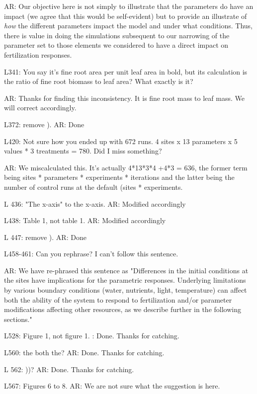 \documentclass{article}
\begin{document}
{\textsf{AR: Our objective here is not simply to illustrate that the parameters do have an impact (we agree that this would be self-evident) but to provide an illustrate of \emph{how} the different parameters impact the model and under what conditions.  Thus, there is value in doing the simulations subsequent to our narrowing of the parameter set to those elements we considered to have a direct impact on fertilization responses. }

L341: You say it's fine root area per unit leaf area in bold, but its calculation is the ratio of fine root biomass to leaf area? What exactly is it?

\textsf{AR: Thanks for finding this inconsistency. It is fine root mass to leaf mass. We will correct accordingly}. 

L372: remove ). 
\textsf{AR: Done}

L420: Not sure how you ended up with 672 runs. 4 sites x 13 parameters x 5 values * 3 treatments = 780. Did I miss something? 

\textsf{AR: We miscalculated this. It's actually 4*13*3*4 +4*3 = 636, the former term being sites * parameters * experiments * iterations and the latter being the number of control runs at the default (sites * experiments.}

L 436: "The x-axis" to the x-axis. 
\textsf{AR: Modified accordingly}

L438: Table 1, not table 1. 
\textsf{AR: Modified accordingly}

L 447: remove ). 
\textsf{AR: Done}

L458-461: Can you rephrase? I can't follow this sentence. 

\textsf{AR: We have re-phrased this sentence as "Differences in the initial conditions at the sites have implications for the parametric responses. Underlying limitations by various boundary conditions (water, nutrients, light, temperature) can affect both the ability of the system to respond to fertilization and/or parameter modifications affecting other resources, as we describe further in the following sections."}

L528: Figure 1, not figure 1. 
\textsf{: Done. Thanks for catching. }

L560: the both the? 
\textsf{AR: Done. Thanks for catching.} 
 
L 562: ))? 
\textsf{AR: Done. Thanks for catching.} 

L567: Figures 6 to 8. 
\textsf{AR: We are not sure what the suggestion is here. }

}
\end{document}
